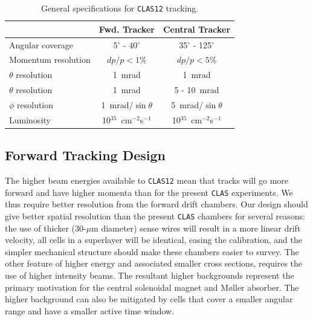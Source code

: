 \begin{table}[htbp]
\begin{center}
\begin{tabular} {||l|c|c||} \hline \hline
                    & {\bf Fwd. Tracker }    & {\bf Central Tracker} \\ \hline
Angular coverage    & 5$^\circ$ - 40$^\circ$ & 35$^\circ$ - 125$^\circ$  \\ \hline
Momentum resolution & $dp/p < 1$$\%$         & $dp/p < 5$$\%$            \\ \hline
$\theta$ resolution & 1~mrad                 & 1~mrad                    \\ \hline
$\theta$ resolution & 1~mrad                 & 5 - 10~mrad               \\ \hline
$\phi$ resolution   & 1~mrad/$\sin \theta$   & 5~mrad/$\sin \theta$      \\ \hline
Luminosity          & 10$^{35}$~cm$^{-2}$s$^{-1}$ & 10$^{35}$~cm$^{-2}$s$^{-1}$ \\ \hline \hline
\end{tabular}
\caption{\small{General specifications for {\tt CLAS12} tracking.}}
\label{tracker-specs}
\end{center}
\end{table}

\subsection{Forward Tracking Design}

The higher beam energies available to {\tt CLAS12} mean that tracks will go 
more forward and have higher momenta than for the present {\tt CLAS} 
experiments.  We thus require better resolution from the forward drift 
chambers.  Our design should give better spatial resolution than the present 
{\tt CLAS} chambers for several reasons: the use of thicker (30-$\mu$m 
diameter) sense wires will result in a more linear drift velocity, all cells 
in a superlayer will be identical, easing the calibration, and the simpler 
mechanical structure should make these chambers easier to survey.  The other 
feature of higher energy and associated smaller cross sections, requires the 
use of higher intensity beams.  The resultant higher backgrounds represent 
the primary motivation for the central solenoidal magnet and M{\o}ller 
absorber.  The higher background can also be mitigated by cells that cover a 
smaller angular range and have a smaller active time window.

